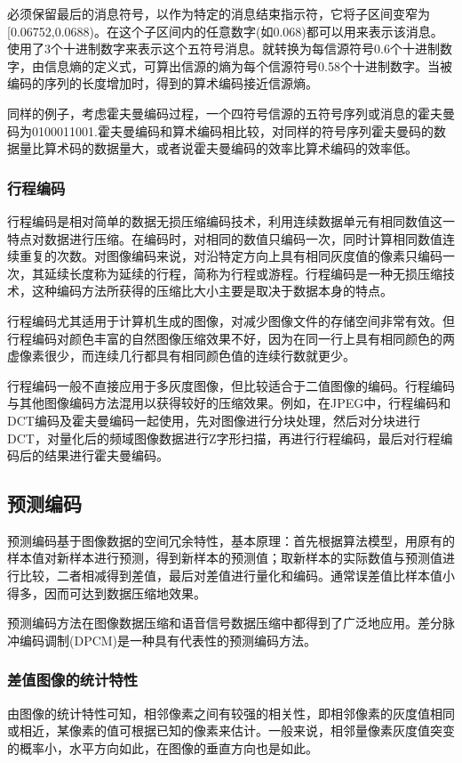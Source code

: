 \documentclass[11pt]{article}
\begin{document}
必须保留最后的消息符号，以作为特定的消息结束指示符，它将子区间变窄为[0.06752,0.0688)。在这个子区间内的任意数字(如0.068)都可以用来表示该消息。使用了3个十进制数字来表示这个五符号消息。就转换为每信源符号0.6个十进制数字，由信息熵的定义式，可算出信源的熵为每个信源符号0.58个十进制数字。当被编码的序列的长度增加时，得到的算术编码接近信源熵。

同样的例子，考虑霍夫曼编码过程，一个四符号信源的五符号序列或消息的霍夫曼码为0100011001.霍夫曼编码和算术编码相比较，对同样的符号序列霍夫曼码的数据量比算术码的数据量大，或者说霍夫曼编码的效率比算术编码的效率低。

\subsubsection{行程编码}
行程编码是相对简单的数据无损压缩编码技术，利用连续数据单元有相同数值这一特点对数据进行压缩。在编码时，对相同的数值只编码一次，同时计算相同数值连续重复的次数。对图像编码来说，对沿特定方向上具有相同灰度值的像素只编码一次，其延续长度称为延续的行程，简称为行程或游程。行程编码是一种无损压缩技术，这种编码方法所获得的压缩比大小主要是取决于数据本身的特点。

行程编码尤其适用于计算机生成的图像，对减少图像文件的存储空间非常有效。但行程编码对颜色丰富的自然图像压缩效果不好，因为在同一行上具有相同颜色的两虚像素很少，而连续几行都具有相同颜色值的连续行数就更少。

行程编码一般不直接应用于多灰度图像，但比较适合于二值图像的编码。行程编码与其他图像编码方法混用以获得较好的压缩效果。例如，在JPEG中，行程编码和DCT编码及霍夫曼编码一起使用，先对图像进行分块处理，然后对分块进行DCT，对量化后的频域图像数据进行Z字形扫描，再进行行程编码，最后对行程编码后的结果进行霍夫曼编码。

\subsection{预测编码}
预测编码基于图像数据的空间冗余特性，基本原理：首先根据算法模型，用原有的样本值对新样本进行预测，得到新样本的预测值；取新样本的实际数值与预测值进行比较，二者相减得到差值，最后对差值进行量化和编码。通常误差值比样本值小得多，因而可达到数据压缩地效果。

预测编码方法在图像数据压缩和语音信号数据压缩中都得到了广泛地应用。差分脉冲编码调制(DPCM)是一种具有代表性的预测编码方法。
\subsubsection{差值图像的统计特性}
由图像的统计特性可知，相邻像素之间有较强的相关性，即相邻像素的灰度值相同或相近，某像素的值可根据已知的像素来估计。一般来说，相邻量像素灰度值突变的概率小，水平方向如此，在图像的垂直方向也是如此。
\end{document}
